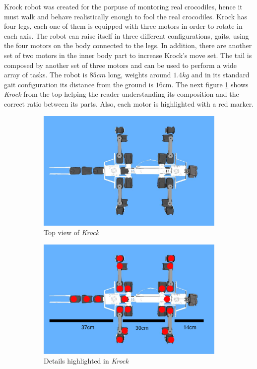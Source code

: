 \documentclass[../document.tex]{subfiles}
\begin{document}
    Krock robot was created for the porpuse of montoring real crocodiles, hence it must walk and behave realistically enough to fool the real crocodiles. Krock has four legs, each one of them is equipped with three motors in order to rotate in each axis. The robot can raise itself in three different configurations, gaits, using the four motors on the body connected to the legs. In addition, there are another set of two motors in the inner body part to increase Krock's move set. 
The tail is composed by another set of three motors and can be used to perform a wide array of tasks.
The robot is $85cm$ long, weights around $1.4kg$ and in its standard gait configuration its distance from the ground is $16$cm. The next figure \ref{fig:krock-top} shows \emph{Krock} from the top helping the reader understanding its composition and the correct ratio between its parts. Also, each motor is highlighted with a red marker.
\begin{figure}[htbp]
\centering
     \begin{subfigure}[b]{0.49\textwidth}
    \includegraphics[width=\textwidth]{../img/krock-top.jpg}
    \caption{Top view of \emph{Krock}}
   	\end{subfigure}
     \begin{subfigure}[b]{0.49\textwidth}
      \includegraphics[width=\textwidth]{../img/krock-top-highlight.png}
    \caption{Details highlighted in \emph{Krock}}
       \end{subfigure}
       \caption{}
   	\label{fig:krock-top}

\end{figure}
\end{document}
